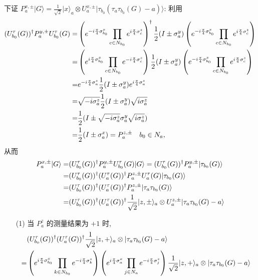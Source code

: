 \documentclass{assignment}
\begin{document}
\begin{pf}
    下证 $P_a^{x,\pm}\lvert G\rangle=\frac{1}{\sqrt{2}}\lvert x\rangle_a\otimes U_a^{x,\pm}\lvert\tau_{b_0}(\tau_a\tau_{b_0}(G)-a)\rangle$: 利用
    \begin{align}
        \notag(U_{b_0}^{\tau}(G))^{\dagger}P_a^{y,\pm}U_{b_0}^{\tau}(G)=&\left(e^{-i\frac{\pi}{4}\sigma_{b_0}^x}\prod_{c\in N_{b_0}}e^{i\frac{\pi}{4}\sigma_c^z}\right)^{\dagger}\frac{1}{2}(I\pm\sigma_a^y)\left(e^{-i\frac{\pi}{4}\sigma_{b_0}^x}\prod_{c\in N_{b_0}}e^{i\frac{\pi}{4}\sigma_c^z}\right)\\
        \notag=&\left(e^{i\frac{\pi}{4}\sigma_{b_0}^x}\prod_{c\in N_{b_0}}e^{-i\frac{\pi}{4}\sigma_c^z}\right)\frac{1}{2}(I\pm\sigma_a^y)\left(e^{-i\frac{\pi}{4}\sigma_{b_0}^x}\prod_{c\in N_{b_0}}e^{i\frac{\pi}{4}\sigma_c^z}\right)\\
        \notag=&e^{-i\frac{\pi}{4}\sigma_a^z}\frac{1}{2}(I\pm\sigma_a^y)e^{i\frac{\pi}{4}\sigma_a^z}\\
        \notag=&\sqrt{-i\sigma_a^z}\frac{1}{2}(I\pm\sigma_a^y)\sqrt{i\sigma_a^z}\\
        \notag=&\frac{1}{2}(I\pm\sqrt{-i\sigma_a^z}\sigma_a^y\sqrt{i\sigma_a^z})\\
        =&\frac{1}{2}(I\pm\sigma_a^x)=P_a^{z,\pm}\quad b_0\in N_a,
    \end{align}
    从而
    \begin{align}
        \notag P_a^{x,\pm}\lvert G\rangle=&(U_{b_0}^{\tau}(G))^{\dagger}P_a^{y,\pm}U_{b_0}^{\tau}(G)\lvert G\rangle=(U_{b_0}^{\tau}(G))^{\dagger}P_a^{y,\pm}\lvert\tau_{b_0}(G)\rangle\\
        \notag=&(U_{b_0}^{\tau}(G))^{\dagger}(U_a^{\tau}(G))^{\dagger}P_a^{z,\pm}U_a^{\tau}(G)\lvert\tau_{b_0}(G)\rangle\\
        \notag=&(U_{b_0}^{\tau}(G))^{\dagger}(U_a^{\tau}(G))^{\dagger}P_a^{z,\pm}\lvert\tau_a\tau_{b_0}(G)\rangle\\
        \notag=&(U_{b_0}^{\tau}(G))^{\dagger}(U_a^{\tau}(G))^{\dagger}\frac{1}{\sqrt{2}}\lvert z,\pm\rangle_a\otimes U_a^{z,\pm}\lvert\tau_a\tau_{b_0}(G)-a\rangle
    \end{align}
    \begin{itemize}
        \item[(1)] 当 $P_a^z$ 的测量结果为 $+1$ 时,
        \begin{align}
            \notag&(U_{b_0}^{\tau}(G))^{\dagger}(U_a^{\tau}(G))^{\dagger}\frac{1}{\sqrt{2}}\lvert z,+\rangle_a\otimes\lvert\tau_a\tau_{b_0}(G)-a\rangle\\
            \notag=&\left(e^{i\frac{\pi}{4}\sigma_{b_0}^x}\prod_{k\in N_{b_0}}e^{-i\frac{\pi}{4}\sigma_k^z}\right)\left(e^{i\frac{\pi}{4}\sigma_a^x}\prod_{j\in N_a}e^{-i\frac{\pi}{4}\sigma_j^z}\right)\frac{1}{\sqrt{2}}\lvert z,+\rangle_a\otimes\lvert\tau_a\tau_{b_0}(G)-a\rangle\\

\end{align}
\end{itemize}
\end{pf}
\end{document}

